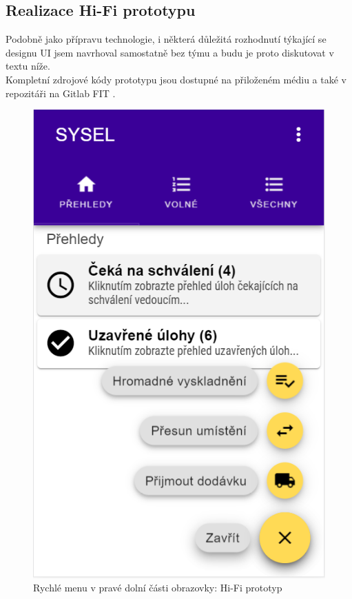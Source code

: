 \subsection{Realizace Hi-Fi prototypu}

Podobně jako přípravu technologie, i některá důležitá rozhodnutí týkající se designu UI jsem navrhoval samostatně bez týmu a budu je proto diskutovat v textu níže.\\
Kompletní zdrojové kódy prototypu jsou dostupné na přiloženém médiu a také v repozitáři na Gitlab FIT \cite{gitlab-hifi}.\\

\begin{figure}[h]
\includegraphics[height=0.45\textheight]{../png/hifi/fab.png}
\caption{Rychlé menu v pravé dolní části obrazovky: Hi-Fi prototyp} \label{picture:hifi:fab}
\end{figure}

